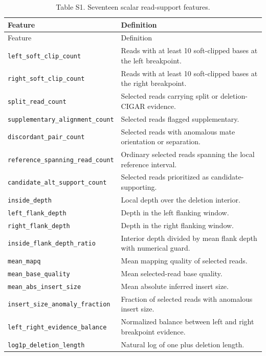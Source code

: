 \documentclass[10pt]{article}
\begin{document}
\begin{longtable}{p{}p{}}
\caption{Table S1. Seventeen scalar read-support features.}\label{tab:s1features}\\
\toprule Feature & Definition\\\midrule\endfirsthead
\toprule Feature & Definition\\\midrule\endhead
\bottomrule\endfoot
\texttt{left\_soft\_clip\_count} & Reads with at least 10 soft-clipped bases at the left breakpoint.\\
\texttt{right\_soft\_clip\_count} & Reads with at least 10 soft-clipped bases at the right breakpoint.\\
\texttt{split\_read\_count} & Selected reads carrying split or deletion-CIGAR evidence.\\
\texttt{supplementary\_alignment\_count} & Selected reads flagged supplementary.\\
\texttt{discordant\_pair\_count} & Selected reads with anomalous mate orientation or separation.\\
\texttt{reference\_spanning\_read\_count} & Ordinary selected reads spanning the local reference interval.\\
\texttt{candidate\_alt\_support\_count} & Selected reads prioritized as candidate-supporting.\\
\texttt{inside\_depth} & Local depth over the deletion interior.\\
\texttt{left\_flank\_depth} & Depth in the left flanking window.\\
\texttt{right\_flank\_depth} & Depth in the right flanking window.\\
\texttt{inside\_flank\_depth\_ratio} & Interior depth divided by mean flank depth with numerical guard.\\
\texttt{mean\_mapq} & Mean mapping quality of selected reads.\\
\texttt{mean\_base\_quality} & Mean selected-read base quality.\\
\texttt{mean\_abs\_insert\_size} & Mean absolute inferred insert size.\\
\texttt{insert\_size\_anomaly\_fraction} & Fraction of selected reads with anomalous insert size.\\
\texttt{left\_right\_evidence\_balance} & Normalized balance between left and right breakpoint evidence.\\
\texttt{log1p\_deletion\_length} & Natural log of one plus deletion length.\\
\end{longtable}
\end{document}
